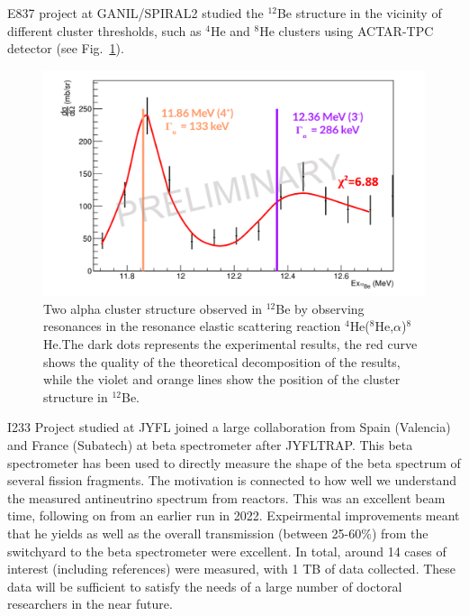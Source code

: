 E837 project at GANIL/SPIRAL2 studied the $^{12}$Be structure in the vicinity of different cluster thresholds, such as $^4$He and $^8$He clusters using ACTAR-TPC detector (see Fig.~\ref{fig:2alpha_cluster}). 

\begin{figure}[!h]
    \centering
    \includegraphics[width=0.7\linewidth]{graphics/2alpha_cluster.png}
    \caption{Two alpha cluster structure observed in $^{12}$Be by observing resonances in the resonance elastic scattering reaction $^4$He($^8$He,$\alpha$)$^8$He.The dark dots represents the experimental results, the red curve shows the quality of the theoretical decomposition of the results, while the violet and orange lines show the position of the cluster structure in $^{12}$Be.
}
    \label{fig:2alpha_cluster}
\end{figure}

I233 Project studied at JYFL joined a large collaboration from Spain (Valencia) and France (Subatech) at beta spectrometer after JYFLTRAP. This beta spectrometer has been used to directly measure the shape of the beta spectrum of several fission fragments. The motivation is connected to how well we understand the measured antineutrino spectrum from reactors.
This was an excellent beam time, following on from an earlier run in 2022. Expeirmental improvements meant that he yields as well as the overall transmission (between 25-60\%) from the switchyard to the beta spectrometer were excellent. In total, around 14 cases of interest (including references) were measured, with 1 TB of data collected. These data will be sufficient to satisfy the needs of a large number of doctoral researchers in the near future.


